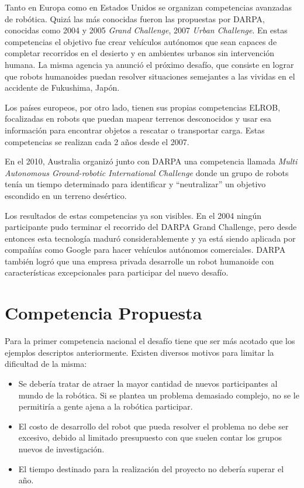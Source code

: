 \documentclass[a4paper,12pt]{article}
\begin{document}
Tanto en Europa como en Estados Unidos se organizan competencias avanzadas de robótica. Quizá las más conocidas fueron las propuestas por DARPA\cite{darpa}, conocidas como 2004 y 2005 \textit{Grand Challenge}, 2007 \textit{Urban Challenge}. En estas competencias el objetivo fue crear vehículos autónomos que sean capaces de completar recorridos en el desierto y en ambientes urbanos sin intervención humana. La misma agencia ya anunció el próximo desafío, que consiste en lograr que robots humanoides puedan resolver situaciones semejantes a las vividas en el accidente de Fukushima, Japón.

Los países europeos, por otro lado, tienen sus propias competencias ELROB\cite{elrob}, focalizadas en robots que puedan mapear terrenos desconocidos y usar esa información para encontrar objetos a rescatar o transportar carga. Estas competencias se realizan cada 2 años desde el 2007.

En el 2010, Australia organizó junto con DARPA una competencia llamada \textit{Multi Autonomous Ground-robotic International Challenge}\cite{magic} donde un grupo de robots tenía un tiempo determinado para identificar y ``neutralizar'' un objetivo escondido en un terreno desértico.

Los resultados de estas competencias ya son visibles. En el 2004 ningún participante pudo terminar el recorrido del DARPA Grand Challenge, pero desde entonces esta tecnología maduró considerablemente y ya está siendo aplicada por compañías como Google para hacer vehículos autónomos comerciales\cite{googlesdc}. DARPA también logró que una empresa privada desarrolle un robot humanoide con características excepcionales para participar del nuevo desafío.\cite{petman}

\section{Competencia Propuesta}

Para la primer competencia nacional el desafío tiene que ser más acotado que los ejemplos descriptos anteriormente. Existen diversos motivos para limitar la dificultad de la misma:
\begin{itemize}
 \item Se debería tratar de atraer la mayor cantidad de nuevos participantes al mundo de la robótica. Si se plantea un problema demasiado complejo, no se le permitiría a gente ajena a la robótica participar.
 \item El costo de desarrollo del robot que pueda resolver el problema no debe ser excesivo, debido al limitado presupuesto con que suelen contar los grupos nuevos de investigación.
 \item El tiempo destinado para la realización del proyecto no debería superar el año.
\end{itemize}
\end{document}
